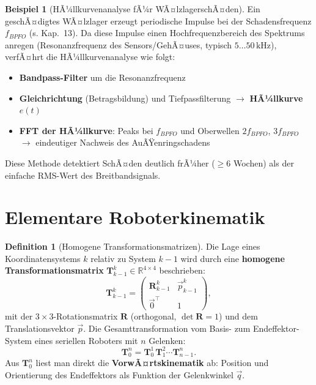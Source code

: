 ﻿\documentclass[a4paper,12pt]{report}
\theoremstyle{definition}
\newtheorem{definition}{Definition}
\newtheorem{beispiel}{Beispiel}
\begin{document}
\begin{beispiel}[HÃ¼llkurvenanalyse fÃ¼r WÃ¤lzlagerschÃ¤den]
Ein geschÃ¤digtes WÃ¤lzlager erzeugt periodische Impulse bei der
Schadensfrequenz $f_{BPFO}$ (s. Kap.\ 13). Da diese Impulse
einen Hochfrequenzbereich des Spektrums anregen (Resonanzfrequenz
des Sensors/GehÃ¤uses, typisch $5\ldots50\,\mathrm{kHz}$), verfÃ¤hrt
die HÃ¼llkurvenanalyse wie folgt:
\begin{itemize}
    \item[-] \textbf{Bandpass-Filter} um die Resonanzfrequenz
    \item[-] \textbf{Gleichrichtung} (Betragsbildung) und Tiefpassfilterung
          $\to$ \textbf{HÃ¼llkurve} $e(t)$
    \item[-] \textbf{FFT der HÃ¼llkurve}: Peaks bei $f_{BPFO}$ und Oberwellen
          $2f_{BPFO}$, $3f_{BPFO}$ $\to$ eindeutiger Nachweis des AuÃŸenringschadens
\end{itemize}
Diese Methode detektiert SchÃ¤den deutlich frÃ¼her ($\ge 6$ Wochen) als der
einfache RMS-Wert des Breitbandsignals.
\end{beispiel}


\section{Elementare Roboterkinematik}

\begin{definition}[Homogene Transformationsmatrizen]
Die Lage eines Koordinatensystems $k$ relativ zu System $k-1$
wird durch eine \textbf{homogene Transformationsmatrix}
$\mathbf{T}_{k-1}^k \in \mathbb{R}^{4\times4}$ beschrieben:
\[
  \mathbf{T}_{k-1}^k = \begin{pmatrix}\mathbf{R}_{k-1}^k & \vec{p}_{k-1}^k \\ \vec{0}^\top & 1\end{pmatrix},
\]
mit der $3\times3$-Rotationsmatrix $\mathbf{R}$ (orthogonal, $\det\mathbf{R}=1$)
und dem Translationsvektor $\vec{p}$.
Die Gesamttransformation vom Basis- zum Endeffektor-System eines
seriellen Roboters mit $n$ Gelenken:
\[
  \mathbf{T}_0^n = \mathbf{T}_0^1\,\mathbf{T}_1^2\cdots\mathbf{T}_{n-1}^n.
\]
Aus $\mathbf{T}_0^n$ liest man direkt die \textbf{VorwÃ¤rtskinematik} ab:
Position und Orientierung des Endeffektors als Funktion der Gelenkwinkel $\vec{q}$.
\end{definition}
\end{document}
